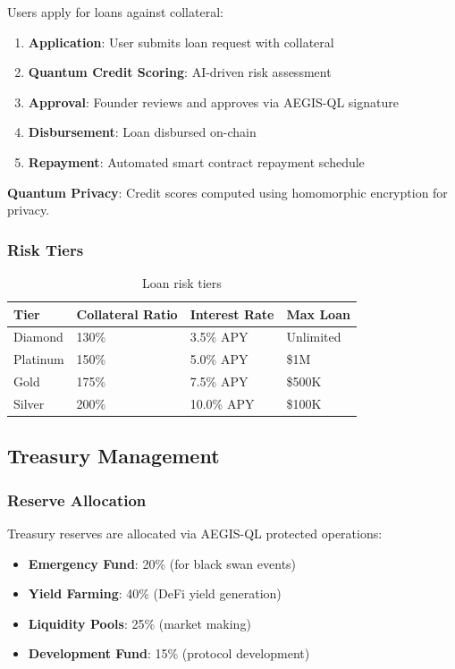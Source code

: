 \documentclass[11pt,a4paper]{article}
\begin{document}
Users apply for loans against collateral:

\begin{enumerate}[leftmargin=*]
    \item \textbf{Application}: User submits loan request with collateral
    \item \textbf{Quantum Credit Scoring}: AI-driven risk assessment
    \item \textbf{Approval}: Founder reviews and approves via AEGIS-QL signature
    \item \textbf{Disbursement}: Loan disbursed on-chain
    \item \textbf{Repayment}: Automated smart contract repayment schedule
\end{enumerate}

\textbf{Quantum Privacy}: Credit scores computed using homomorphic encryption for privacy.

\subsubsection{Risk Tiers}

\begin{table}[h]
\centering
\begin{tabular}{@{}llll@{}}
\toprule
\textbf{Tier} & \textbf{Collateral Ratio} & \textbf{Interest Rate} & \textbf{Max Loan} \\ \midrule
Diamond & 130\% & 3.5\% APY & Unlimited \\
Platinum & 150\% & 5.0\% APY & \$1M \\
Gold & 175\% & 7.5\% APY & \$500K \\
Silver & 200\% & 10.0\% APY & \$100K \\ \bottomrule
\end{tabular}
\caption{Loan risk tiers}
\label{tab:risk_tiers}
\end{table}

\subsection{Treasury Management}

\subsubsection{Reserve Allocation}

Treasury reserves are allocated via AEGIS-QL protected operations:

\begin{itemize}[leftmargin=*]
    \item \textbf{Emergency Fund}: 20\% (for black swan events)
    \item \textbf{Yield Farming}: 40\% (DeFi yield generation)
    \item \textbf{Liquidity Pools}: 25\% (market making)
    \item \textbf{Development Fund}: 15\% (protocol development)
\end{itemize}
\end{document}
